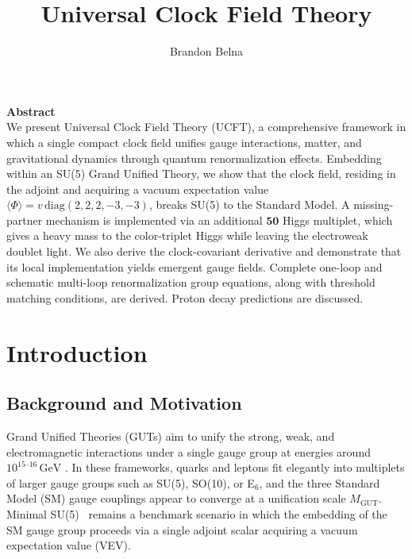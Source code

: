 \documentclass[aps,prd,preprint,groupedaddress]{revtex4-2}
\begin{document}

\title{Universal Clock Field Theory}

\author{Brandon Belna}


\maketitle
{\centering \textbf{Abstract}\\}
We present Universal Clock Field Theory (UCFT), a comprehensive framework in which a single compact clock field unifies gauge interactions, matter,
and gravitational dynamics through quantum renormalization effects.
Embedding within an SU(5) Grand Unified Theory,
we show that the clock field, residing in the adjoint and acquiring a vacuum expectation value 
$\langle \Phi\rangle = v\,\mathrm{diag}(2,2,2,-3,-3)$, breaks SU(5) to the Standard Model.
A missing-partner mechanism is implemented via an additional $\mathbf{50}$ Higgs multiplet,
which gives a heavy mass to the color-triplet Higgs while leaving the electroweak doublet light.
We also derive the clock-covariant derivative and demonstrate that its local implementation yields
emergent gauge fields.
Complete one-loop and schematic multi-loop renormalization group equations, along with threshold matching
conditions, are derived. Proton decay predictions are discussed.
\clearpage
\tableofcontents
\clearpage

\setcounter{page}{1}  %

\section{Introduction}
\label{sec:intro}

\subsection{Background and Motivation}

Grand Unified Theories (GUTs) aim to unify the strong, weak, and electromagnetic interactions under a single gauge group at energies around $10^{15\text{--}16}\,\mathrm{GeV}$ \cite{georgi1974unified,fritzsch1975unified}.  In these frameworks, quarks and leptons fit elegantly into multiplets of larger gauge groups such as SU(5), SO(10), or E$_6$, and the three Standard Model (SM) gauge couplings appear to converge at a unification scale \(M_{\mathrm{GUT}}\).  Minimal SU(5)~\cite{georgi1974unified} remains a benchmark scenario in which the embedding of the SM gauge group proceeds via a single adjoint scalar acquiring a vacuum expectation value (VEV).
\end{document}
